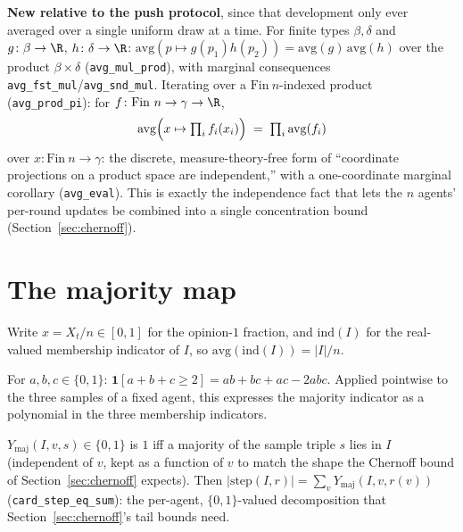 \begin{lemma}\label{lem:indep}
  \leanok
  \textbf{New relative to the push protocol}, since that development only
  ever averaged over a single uniform draw at a time. For finite types
  $\beta,\delta$ and $g \colon \beta\to\R$, $h\colon\delta\to\R$:
  $\mathrm{avg}(p \mapsto g(p_1)h(p_2)) = \mathrm{avg}(g)\,\mathrm{avg}(h)$
  over the product $\beta\times\delta$ (\texttt{avg\_mul\_prod}), with
  marginal consequences \texttt{avg\_fst\_mul}/\texttt{avg\_snd\_mul}.
  Iterating over a $\mathrm{Fin}\ n$-indexed product
  (\texttt{avg\_prod\_pi}): for $f \colon \mathrm{Fin}\ n \to \gamma \to \R$,
  \[
    \mathrm{avg}\Bigl(x \mapsto \textstyle\prod_i f_i(x_i)\Bigr)
      \;=\; \prod_i \mathrm{avg}(f_i)
  \]
  over $x \colon \mathrm{Fin}\ n \to \gamma$: the discrete,
  measure-theory-free form of ``coordinate projections on a product space
  are independent,'' with a one-coordinate marginal corollary
  (\texttt{avg\_eval}). This is exactly the independence fact that lets the
  $n$ agents' per-round updates be combined into a single concentration
  bound (Section~\ref{sec:chernoff}).
\end{lemma}

\section{The majority map}\label{sec:map}

Write $x = X_t/n \in [0,1]$ for the opinion-$1$ fraction, and
$\mathrm{ind}(I)$ for the real-valued membership indicator of $I$, so
$\mathrm{avg}(\mathrm{ind}(I)) = |I|/n$.

\begin{lemma}\label{lem:majpoly}
  \leanok
  For $a,b,c \in \{0,1\}$: $\mathbf 1[a+b+c\ge2] = ab+bc+ac-2abc$. Applied
  pointwise to the three samples of a fixed agent, this expresses the
  majority indicator as a polynomial in the three membership indicators.
\end{lemma}

\begin{definition}\label{def:Ymaj}
  \leanok
  $Y_{\mathrm{maj}}(I,v,s) \in \{0,1\}$ is $1$ iff a majority of the sample
  triple $s$ lies in $I$ (independent of $v$, kept as a function of $v$ to
  match the shape the Chernoff bound of Section~\ref{sec:chernoff} expects).
  Then $|\mathrm{step}(I,r)| = \sum_v Y_{\mathrm{maj}}(I,v,r(v))$
  (\texttt{card\_step\_eq\_sum}): the per-agent, $\{0,1\}$-valued
  decomposition that Section~\ref{sec:chernoff}'s tail bounds need.
\end{definition}

